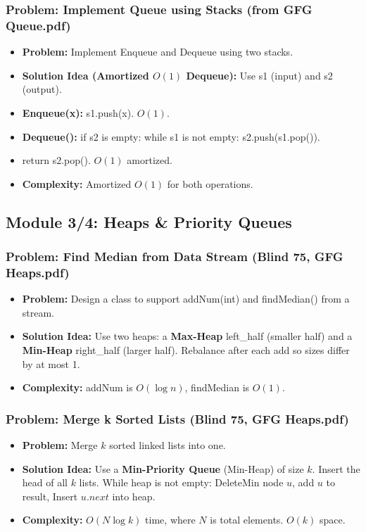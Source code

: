 \subsubsection{Problem: Implement Queue using Stacks (from GFG Queue.pdf)}
\begin{itemize}
\item \textbf{Problem:} Implement Enqueue and Dequeue using two stacks.
\item \textbf{Solution Idea (Amortized $O(1)$ Dequeue):} Use s1 (input) and s2 (output).
\item \textbf{Enqueue(x):} s1.push(x). $O(1)$.
\item \textbf{Dequeue():} if s2 is empty: while s1 is not empty: s2.push(s1.pop()).
\item return s2.pop(). $O(1)$ amortized.
\item \textbf{Complexity:} Amortized $O(1)$ for both operations.
\end{itemize}

\subsection{Module 3/4: Heaps \& Priority Queues}

\subsubsection{Problem: Find Median from Data Stream (Blind 75, GFG Heaps.pdf)}
\begin{itemize}
\item \textbf{Problem:} Design a class to support addNum(int) and findMedian() from a stream.
\item \textbf{Solution Idea:} Use two heaps: a \textbf{Max-Heap} left\_half (smaller half) and a \textbf{Min-Heap} right\_half (larger half). Rebalance after each add so sizes differ by at most 1.
\item \textbf{Complexity:} addNum is $O(\log n)$, findMedian is $O(1)$.
\end{itemize}

\subsubsection{Problem: Merge k Sorted Lists (Blind 75, GFG Heaps.pdf)}
\begin{itemize}
\item \textbf{Problem:} Merge $k$ sorted linked lists into one.
\item \textbf{Solution Idea:} Use a \textbf{Min-Priority Queue} (Min-Heap) of size $k$. Insert the head of all $k$ lists. While heap is not empty: DeleteMin node $u$, add $u$ to result, Insert $u.next$ into heap.
\item \textbf{Complexity:} $O(N \log k)$ time, where $N$ is total elements. $O(k)$ space.
\end{itemize}

